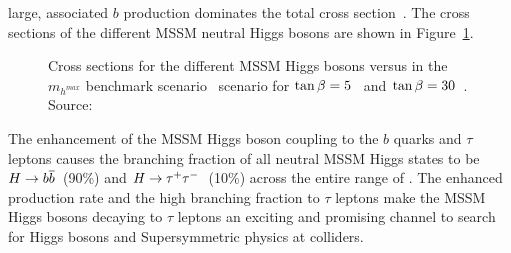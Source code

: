 large, associated $b$ production dominates the total cross section~\cite{LHCHiggsXSecGroup}. The cross sections of the different MSSM
neutral Higgs bosons are shown in Figure~\ref{fig:MSSMXSectionsTanBeta}.
\begin{figure}
  \centering
  \caption[MSSM Higgs boson cross sections at the LHC]{Cross sections for the
  different MSSM Higgs bosons versus \ma in the $m_{h^{max}}$ benchmark
  scenario~\cite{MHMaxBenchmark} scenario for
  $\tan\beta=5$~ and
  $\tan\beta=30$~.  Source:~\cite{LHCHiggsXSecGroup}
  }
  \label{fig:MSSMXSectionsTanBeta}
\end{figure}
The \tanb enhancement of the MSSM Higgs boson coupling to the $b$ quarks and $\tau$
leptons causes the branching fraction of all neutral MSSM Higgs states to be
$H\to{b\overline{b}}$~(90\%) and $H\to\tau^+\tau^-$~(10\%) across the entire range of \ma.  The
enhanced production rate and the high branching fraction to $\tau$ leptons make
the MSSM Higgs bosons decaying to $\tau$ leptons an exciting and promising channel to
search for Higgs bosons and Supersymmetric physics at colliders.

